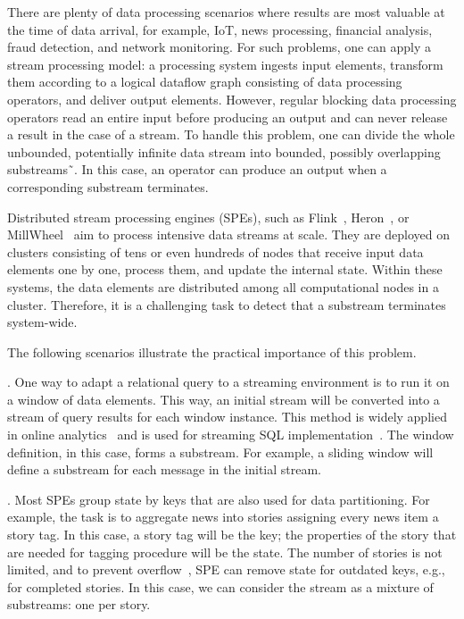 \label {fs-acker-intro}

There are plenty of data processing scenarios where results are most valuable at the time of data arrival, for example, IoT, news processing, financial analysis, fraud detection, and network monitoring. For such problems, one can apply a stream processing model: a processing system ingests input elements, transform them according to a logical dataflow graph consisting of data processing operators, and deliver output elements. However, regular blocking data processing operators read an entire input before producing an output and can never release a result in the case of a stream. To handle this problem, one can divide the whole unbounded, potentially infinite data stream into bounded, possibly overlapping substreams˜\cite{tucker2003exploiting}. In this case, an operator can produce an output when a corresponding substream terminates.

Distributed stream processing engines (SPEs), such as Flink~\cite{carbone2015apache}, Heron~\cite{Kulkarni:2015:THS:2723372.2742788}, or MillWheel~\cite{Akidau:2013:MFS:2536222.2536229} aim to process intensive data streams at scale. They are deployed on clusters consisting of tens or even hundreds of nodes that receive input data elements one by one, process them, and update the internal state. Within these systems, the data elements are distributed among all computational nodes in a cluster. Therefore, it is a challenging task to detect that a substream terminates system-wide. 

The following scenarios illustrate the practical importance of this problem.

. One way to adapt a relational query to a streaming environment is to run it on a window of data elements. This way, an initial stream will be converted into a stream of query results for each window instance. This method is widely applied in online analytics~\cite{traub2018scotty} and is used for streaming SQL implementation~\cite{Begoli:2019:OSR:3299869.3314040}. The window definition, in this case, forms a substream. For example, a sliding window will define a substream for each message in the initial stream.

. Most SPEs group state by keys that are also used for data partitioning. For example, the task is to aggregate news into stories assigning every news item a story tag. In this case, a story tag will be the key; the properties of the story that are needed for tagging procedure will be the state. The number of stories is not limited, and to prevent overflow~\cite{Tucker:2003:EPS:776752.776780}, SPE can remove state for outdated keys, e.g., for completed stories. In this case, we can consider the stream as a mixture of substreams: one per story.  

